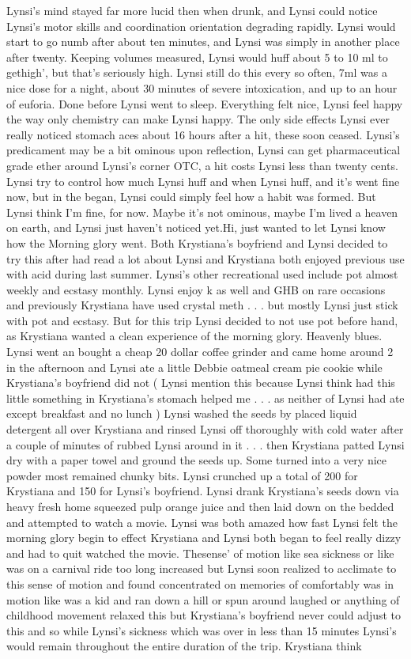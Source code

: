 \documentclass[12pt]{book}
\begin{document}
Lynsi's mind stayed far more lucid then when drunk, and Lynsi could notice Lynsi's motor skills and coordination orientation degrading rapidly. Lynsi would start to go numb after about ten minutes, and Lynsi was simply in another place after twenty. Keeping volumes measured, Lynsi would huff about 5 to 10 ml to gethigh', but that's seriously high. Lynsi still do this every so often, 7ml was a nice dose for a night, about 30 minutes of severe intoxication, and up to an hour of euforia. Done before Lynsi went to sleep. Everything felt nice, Lynsi feel happy the way only chemistry can make Lynsi happy. The only side effects Lynsi ever really noticed stomach aces about 16 hours after a hit, these soon ceased. Lynsi's predicament may be a bit ominous upon reflection, Lynsi can get pharmaceutical grade ether around Lynsi's corner OTC, a hit costs Lynsi less than twenty cents. Lynsi try to control how much Lynsi huff and when Lynsi huff, and it's went fine now, but in the began, Lynsi could simply feel how a habit was formed. But Lynsi think I'm fine, for now. Maybe it's not ominous, maybe I'm lived a heaven on earth, and Lynsi just haven't noticed yet.Hi, just wanted to let Lynsi know how the Morning glory went. Both Krystiana's boyfriend and Lynsi decided to try this after had read a lot about Lynsi and Krystiana both enjoyed previous use with acid during last summer. Lynsi's other recreational used include pot almost weekly and ecstasy monthly. Lynsi enjoy k as well and GHB on rare occasions and previously Krystiana have used crystal meth . . .  but mostly Lynsi just stick with pot and ecstasy. But for this trip Lynsi decided to not use pot before hand, as Krystiana wanted a clean experience of the morning glory. Heavenly blues. Lynsi went an bought a cheap 20 dollar coffee grinder and came home around 2 in the afternoon and Lynsi ate a little Debbie oatmeal cream pie cookie while Krystiana's boyfriend did not ( Lynsi mention this because Lynsi think had this little something in Krystiana's stomach helped me . . .  as neither of Lynsi had ate except breakfast and no lunch ) Lynsi washed the seeds by placed liquid detergent all over Krystiana and rinsed Lynsi off thoroughly with cold water after a couple of minutes of rubbed Lynsi around in it . . .  then Krystiana patted Lynsi dry with a paper towel and ground the seeds up. Some turned into a very nice powder most remained chunky bits. Lynsi crunched up a total of 200 for Krystiana and 150 for Lynsi's boyfriend. Lynsi drank Krystiana's seeds down via heavy fresh home squeezed pulp orange juice and then laid down on the bedded and attempted to watch a movie. Lynsi was both amazed how fast Lynsi felt the morning glory begin to effect Krystiana and Lynsi both began to feel really dizzy and had to quit watched the movie. Thesense' of motion like sea sickness or like was on a carnival ride too long increased but Lynsi soon realized to acclimate to this sense of motion and found concentrated on memories of comfortably was in motion like was a kid and ran down a hill or spun around laughed or anything of childhood movement relaxed this but Krystiana's boyfriend never could adjust to this and so while Lynsi's sickness which was over in less than 15 minutes Lynsi's would remain throughout the entire duration of the trip. Krystiana think 
\end{document}
